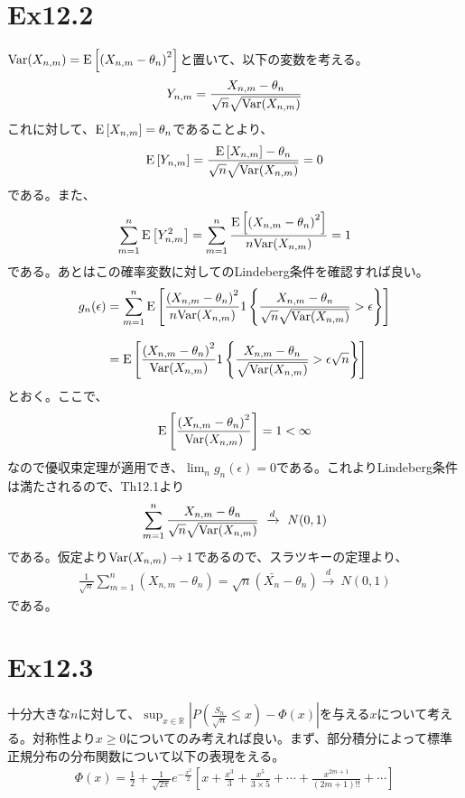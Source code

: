 \documentclass{article}
\begin{document}
\section{Ex12.2}
${\rm Var}(X_{n,m}) = {\rm E}\left[ \left( X_{n,m} - \theta_n \right)^2 \right]$と置いて、以下の変数を考える。
\begin{align*}
	Y_{n,m} = \frac{X_{n,m} - \theta_n}{\sqrt{n} \sqrt{{\rm Var}(X_{n,m})}}
\end{align*}
これに対して、${\rm E}\left[ X_{n,m} \right] = \theta_n$であることより、
\begin{align*}
	{\rm E}\left[ Y_{n,m} \right] = \frac{{\rm E}\left[ X_{n,m} \right] - \theta_n}{\sqrt{n} \sqrt{{\rm Var}(X_{n,m})}} = 0
\end{align*}
である。また、
\begin{align*}
	 \sum_{m=1}^n{\rm E}\left[ Y_{n,m}^2 \right] =\sum_{m=1}^n \frac{{\rm E}\left[ \left( X_{n,m} - \theta_n \right)^2 \right]}{n{\rm Var}(X_{n,m})} = 1
\end{align*}
である。あとはこの確率変数に対してのLindeberg条件を確認すれば良い。
\begin{align*}
	g_n(\epsilon) &= \sum_{m=1}^n {\rm E} \left[ \frac{ \left( X_{n,m} - \theta_n \right)^2}{n{\rm Var}(X_{n,m})} 1\left\{  \frac{X_{n,m} - \theta_n}{\sqrt{n} \sqrt{{\rm Var}(X_{n,m})}} > \epsilon \right\} \right]\\[8pt]
	&= {\rm E}\left[  \frac{ \left( X_{n,m} - \theta_n \right)^2}{{\rm Var}(X_{n,m})} 1\left\{  \frac{X_{n,m} - \theta_n}{\sqrt{{\rm Var}(X_{n,m})}} > \epsilon \sqrt{n} \right\} \right]
\end{align*}
とおく。ここで、
\begin{align*}
	{\rm E}\left[  \frac{ \left( X_{n,m} - \theta_n \right)^2}{{\rm Var}(X_{n,m})}  \right] = 1 < \infty
\end{align*}
なので優収束定理が適用でき、$\lim_n g_n(\epsilon) = 0$である。これよりLindeberg条件は満たされるので、Th12.1より
\begin{align*}
	\sum_{m=1}^n \frac{X_{n,m} - \theta_n}{\sqrt{n} \sqrt{{\rm Var}(X_{n,m})}}\ \xrightarrow{d}\ N(0,1)
\end{align*}
である。仮定より${\rm Var}(X_{n,m}) \to 1$であるので、スラツキーの定理より、
\begin{align*}
	\frac{1}{\sqrt{n}} \sum_{m=1}^n (X_{n,m} - \theta_n) = \sqrt{n} (\bar{X_n} - \theta_n) \xrightarrow{d}\ N(0,1)
\end{align*}
である。

\section{Ex12.3}
十分大きな$n$に対して、$\sup_{x\in \mathbb{R}} \left| P\left( \frac{S_n}{\sqrt{n}} \leq x \right) - \Phi(x) \right|$を与える$x$について考える。対称性より$x \geq 0$についてのみ考えれば良い。まず、部分積分によって標準正規分布の分布関数について以下の表現をえる。
\begin{align}
	\Phi(x) = \frac{1}{2} + \frac{1}{\sqrt{2\pi}} e^{- \frac{x^2}{2}} \left[ x + \frac{x^3}{3} + \frac{x^5}{3\times 5} + \cdots + \frac{x^{2m+1}}{(2m+1)!!} + \cdots \right]
\end{align}
\end{document}
